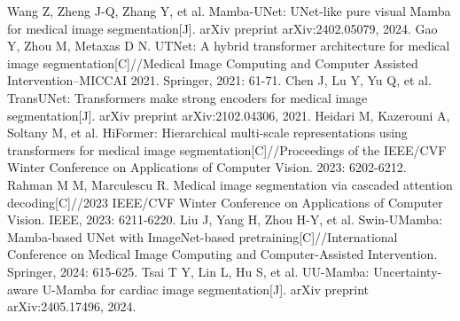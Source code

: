 \documentclass[12pt, a4paper, twoside]{article}
\begin{document}
{     Wang Z, Zheng J-Q, Zhang Y, et al. Mamba-UNet: UNet-like pure visual Mamba for medical image segmentation[J]. arXiv preprint arXiv:2402.05079, 2024.
     Gao Y, Zhou M, Metaxas D N. UTNet: A hybrid transformer architecture for medical image segmentation[C]//Medical Image Computing and Computer Assisted Intervention--MICCAI 2021. Springer, 2021: 61-71.
     Chen J, Lu Y, Yu Q, et al. TransUNet: Transformers make strong encoders for medical image segmentation[J]. arXiv preprint arXiv:2102.04306, 2021.
     Heidari M, Kazerouni A, Soltany M, et al. HiFormer: Hierarchical multi-scale representations using transformers for medical image segmentation[C]//Proceedings of the IEEE/CVF Winter Conference on Applications of Computer Vision. 2023: 6202-6212.
     Rahman M M, Marculescu R. Medical image segmentation via cascaded attention decoding[C]//2023 IEEE/CVF Winter Conference on Applications of Computer Vision. IEEE, 2023: 6211-6220.
     Liu J, Yang H, Zhou H-Y, et al. Swin-UMamba: Mamba-based UNet with ImageNet-based pretraining[C]//International Conference on Medical Image Computing and Computer-Assisted Intervention. Springer, 2024: 615-625.
     Tsai T Y, Lin L, Hu S, et al. UU-Mamba: Uncertainty-aware U-Mamba for cardiac image segmentation[J]. arXiv preprint arXiv:2405.17496, 2024.
}

\end{document}
